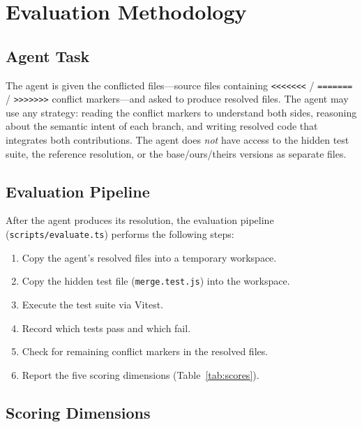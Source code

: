 \documentclass[11pt,a4paper]{article}
\begin{document}
\section{Evaluation Methodology}
\label{sec:methodology}

\subsection{Agent Task}

The agent is given the conflicted files---source files containing \texttt{<{}<{}<{}<{}<{}<{}<} / \texttt{=======} / \texttt{>{}>{}>{}>{}>{}>{}>{}} conflict markers---and asked to produce resolved files. The agent may use any strategy: reading the conflict markers to understand both sides, reasoning about the semantic intent of each branch, and writing resolved code that integrates both contributions. The agent does \emph{not} have access to the hidden test suite, the reference resolution, or the base/ours/theirs versions as separate files.

\subsection{Evaluation Pipeline}

After the agent produces its resolution, the evaluation pipeline (\texttt{scripts/evaluate.ts}) performs the following steps:

\begin{enumerate}[leftmargin=2em]
\item Copy the agent's resolved files into a temporary workspace.
\item Copy the hidden test file (\texttt{merge.test.js}) into the workspace.
\item Execute the test suite via Vitest.
\item Record which tests pass and which fail.
\item Check for remaining conflict markers in the resolved files.
\item Report the five scoring dimensions (Table~\ref{tab:scores}).
\end{enumerate}

\subsection{Scoring Dimensions}
\end{document}

